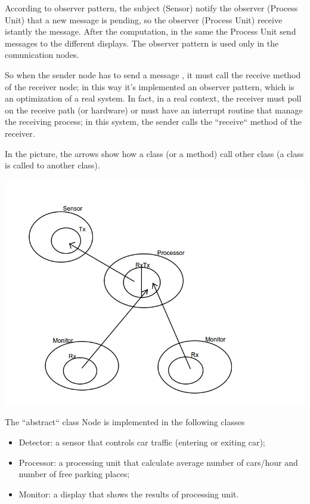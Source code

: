 \documentclass[a4paper,titlepage]{article}
\begin{document}
According to observer pattern, the subject (Sensor) notify the observer (Process Unit) that a new message is pending, so the observer (Process Unit) receive istantly the message. After the computation, in the same the Process Unit send messages to the different displays.
The observer pattern is used only in the comunication nodes.

So when the sender node has to send a message , it must call the receive method of the receiver node; in this way it's implemented an observer pattern, which is an optimization of a real system. In fact, in a real context, the receiver must poll on the receive path (or hardware) or must have an interrupt routine that manage the receiving process; in this system, the sender calls the ``receive`` method of the receiver.

In the picture, the arrows show how a class (or a method) call other class (a class is called to another class).

    \begin{center}

    \centering
    \includegraphics[scale=0.40]{pattern.jpg}

    \end{center}


The ``abstract`` class Node is implemented in the following classes

\begin{itemize}[noitemsep,topsep=20pt,parsep=10pt,partopsep=20pt]

\item Detector: a sensor that controls car traffic (entering or exiting car);
\item Processor: a processing unit that calculate average number of cars/hour and number of free parking places;
\item Monitor: a display that shows the results of processing unit.

\end{itemize}
\end{document}

